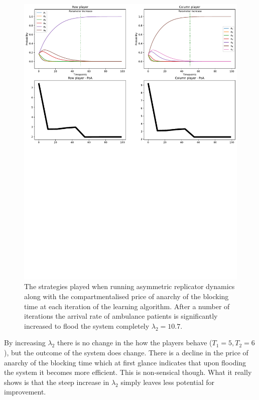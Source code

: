 \begin{figure}[H]
    \includegraphics[width=\textwidth, trim=0 400 0 0]{imgs/asymmetric_rd_and_PoA/asymmetric_flooding.pdf}
    \caption{The strategies played when running asymmetric replicator dynamics
    along with the compartmentalised price of anarchy of the blocking time at
    each iteration of the learning algorithm. After a number of iterations the 
    arrival rate of ambulance patients is significantly increased to flood the
    system completely \( \lambda_2 = 10.7 \).}
    \label{fig:ard_lambda_2}
\end{figure}


By increasing \(\lambda_2\) there is no change in the how the players behave
(\(T_1 = 5, T_2 = 6\)), but the outcome of the system does change. 
There is a decline in the price of anarchy of the blocking time which at first 
glance indicates that upon flooding the system it becomes more efficient. 
This is non-sensical though.
What it really shows is that the steep increase in \( \lambda_2 \) simply leaves 
less potential for improvement. 

